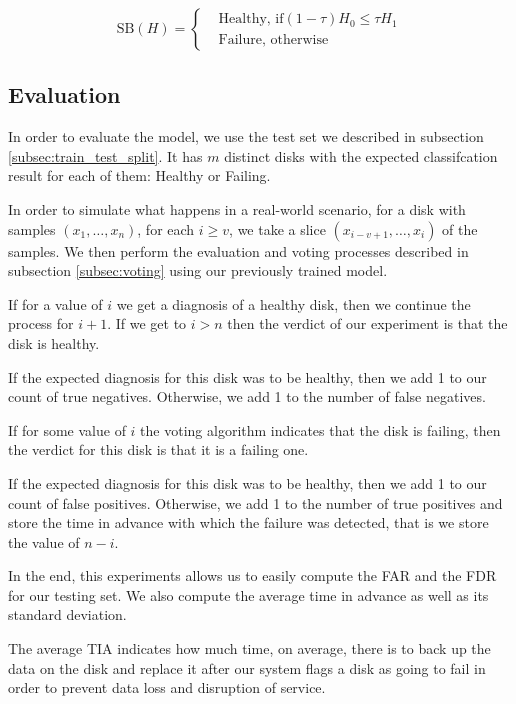 \begin{equation}\label{eq:score_based_voting}
  \text{SB}(H) = 
    \begin{cases}
        & \text{Healthy, if} (1-\tau)H_0 \leq \tau H_1 \\
        & \text{Failure, otherwise} 
  \end{cases}
\end{equation}

\subsection{Evaluation}

In order to evaluate the model, we use the test set we described in subsection \ref{subsec:train_test_split}.
It has $m$ distinct disks with the expected classifcation result for each of them: Healthy or Failing.

In order to simulate what happens in a real-world scenario, for a disk with samples $(x_1,\dots,x_n)$, for each $i \geq v$, we take a slice $(x_{i-v+1}, \dots, x_i)$ of the samples.
We then perform the evaluation and voting processes described in subsection \ref{subsec:voting} using our previously trained model.

If for a value of $i$ we get a diagnosis of a healthy disk, then we continue the process for $i+1$.
If we get to $i > n$ then the verdict of our experiment is that the disk is healthy.

If the expected diagnosis for this disk was to be healthy, then we add 1 to our count of true negatives.
Otherwise, we add 1 to the number of false negatives.

If for some value of $i$ the voting algorithm indicates that the disk is failing, then the verdict for this disk is that it is a failing one.

If the expected diagnosis for this disk was to be healthy, then we add 1 to our count of false positives.
Otherwise, we add 1 to the number of true positives and store the time in advance with which the failure was detected, that is we store the value of $n-i$.

In the end, this experiments allows us to easily compute the FAR and the FDR for our testing set.
We also compute the average time in advance as well as its standard deviation.

The average TIA indicates how much time, on average, there is to back up the data on the disk and replace it after our system flags a disk as going to fail in order to prevent data loss and disruption of service. 


